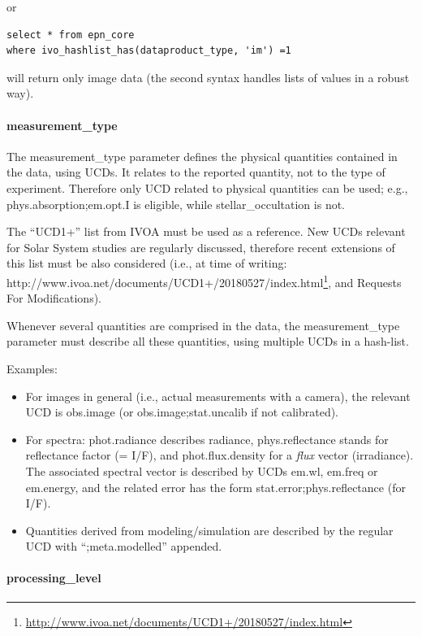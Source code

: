 \documentclass[11pt,a4paper]{ivoa}
\begin{document}
or 

\begin{verbatim}
select * from epn_core 
where ivo_hashlist_has(dataproduct_type, 'im') =1
\end{verbatim}

will return only image data (the second syntax handles lists of values in a robust way).

\paragraph{measurement\_type}

The measurement\_type parameter defines the physical quantities contained in the data, using UCDs. It relates to the reported quantity, not to the type of experiment. Therefore only UCD related to physical quantities can be used; e.g., phys.absorption;em.opt.I is eligible, while stellar\_occultation is not.

The ``UCD1+'' list from IVOA must be used as a reference. New UCDs relevant for Solar System studies are regularly discussed, therefore recent extensions of this list must be also considered (i.e., at time of writing: http://www.ivoa.net/documents/UCD1+/20180527/index.html\footnote{\url{http://www.ivoa.net/documents/UCD1+/20180527/index.html}}, and Requests For Modifications). 

Whenever several quantities are comprised in the data, the measurement\_type parameter must describe all these quantities, using multiple UCDs in a hash-list. 

Examples:

\begin{itemize}
\item For images in general (i.e., actual measurements with a camera), the relevant UCD is obs.image (or obs.image;stat.uncalib if not calibrated).
\item For spectra: phot.radiance describes radiance, phys.reflectance stands for reflectance factor (= I/F), and phot.flux.density for a \emph{flux} vector (irradiance). The associated spectral vector is described by UCDs em.wl, em.freq or em.energy, and the related error has the form stat.error;phys.reflectance (for I/F).
\item Quantities derived from modeling/simulation are described by the regular UCD with ``;meta.modelled'' appended. 
\end{itemize}

\paragraph{processing\_level}
\end{document}
